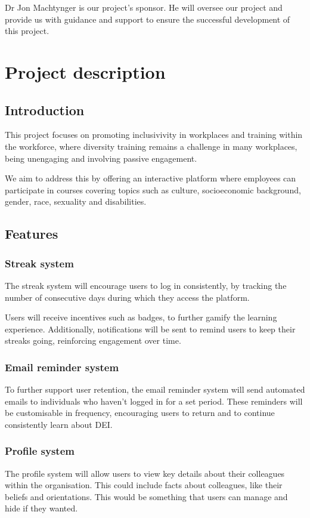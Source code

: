 \documentclass{scrartcl}
\begin{document}
\par
Dr Jon Machtynger is our project's sponsor.
He will oversee our project and provide us with guidance and support to ensure the successful development of this project.

\section{Project description}
\subsection{Introduction}
This project focuses on promoting inclusivivity in workplaces and training within the workforce, where diversity training remains a challenge in many workplaces, being unengaging and involving passive engagement.

\par
We aim to address this by offering an interactive platform where employees can participate in courses covering topics such as culture, socioeconomic background, gender, race, sexuality and disabilities.

\subsection{Features}
\subsubsection{Streak system}

The streak system will encourage users to log in consistently, by tracking the number of consecutive days during which they access the platform.

\par
Users will receive incentives such as badges, to further gamify the learning experience.
Additionally, notifications will be sent to remind users to keep their streaks going, reinforcing engagement over time.

\subsubsection{Email reminder system}
To further support user retention, the email reminder system will send automated emails to individuals who haven't logged in for a set period.
These reminders will be customisable in frequency, encouraging users to return and to continue consistently learn about DEI.

\subsubsection{Profile system}
The profile system will allow users to view key details about their colleagues within the organisation. This could include facts about colleagues, like their beliefs and orientations. This would be something that users can manage and hide if they wanted.
\end{document}
